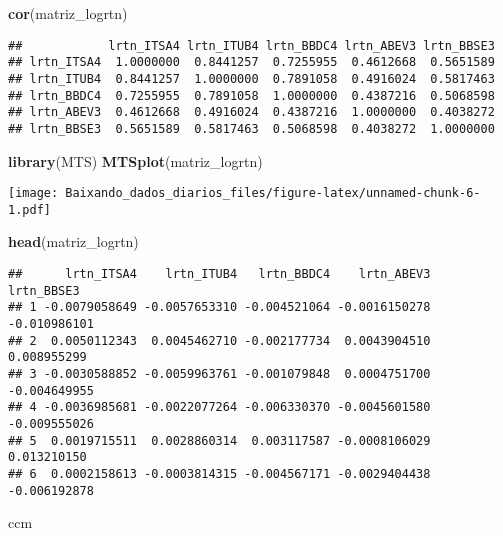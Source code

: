 \documentclass[]{article}
\newenvironment{Shaded}{\begin{snugshade}}{\end{snugshade}}
\newcommand{\KeywordTok}[1]{\textcolor[rgb]{0.13,0.29,0.53}{\textbf{{#1}}}}
\newcommand{\NormalTok}[1]{{#1}}
\begin{document}
\begin{Shaded}
\begin{Highlighting}[]
\KeywordTok{cor}\NormalTok{(matriz_logrtn)}
\end{Highlighting}
\end{Shaded}

\begin{verbatim}
##            lrtn_ITSA4 lrtn_ITUB4 lrtn_BBDC4 lrtn_ABEV3 lrtn_BBSE3
## lrtn_ITSA4  1.0000000  0.8441257  0.7255955  0.4612668  0.5651589
## lrtn_ITUB4  0.8441257  1.0000000  0.7891058  0.4916024  0.5817463
## lrtn_BBDC4  0.7255955  0.7891058  1.0000000  0.4387216  0.5068598
## lrtn_ABEV3  0.4612668  0.4916024  0.4387216  1.0000000  0.4038272
## lrtn_BBSE3  0.5651589  0.5817463  0.5068598  0.4038272  1.0000000
\end{verbatim}

\begin{Shaded}
\begin{Highlighting}[]
\KeywordTok{library}\NormalTok{(MTS)}
\KeywordTok{MTSplot}\NormalTok{(matriz_logrtn)}
\end{Highlighting}
\end{Shaded}

\texttt{[image: Baixando\_dados\_diarios\_files/figure-latex/unnamed-chunk-6-1.pdf]}

\begin{Shaded}
\begin{Highlighting}[]
\KeywordTok{head}\NormalTok{(matriz_logrtn)}
\end{Highlighting}
\end{Shaded}

\begin{verbatim}
##      lrtn_ITSA4    lrtn_ITUB4   lrtn_BBDC4    lrtn_ABEV3   lrtn_BBSE3
## 1 -0.0079058649 -0.0057653310 -0.004521064 -0.0016150278 -0.010986101
## 2  0.0050112343  0.0045462710 -0.002177734  0.0043904510  0.008955299
## 3 -0.0030588852 -0.0059963761 -0.001079848  0.0004751700 -0.004649955
## 4 -0.0036985681 -0.0022077264 -0.006330370 -0.0045601580 -0.009555026
## 5  0.0019715511  0.0028860314  0.003117587 -0.0008106029  0.013210150
## 6  0.0002158613 -0.0003814315 -0.004567171 -0.0029404438 -0.006192878
\end{verbatim}

\begin{Shaded}
\begin{Highlighting}[]
\NormalTok{ccm}
\end{Highlighting}
\end{Shaded}
\end{document}
